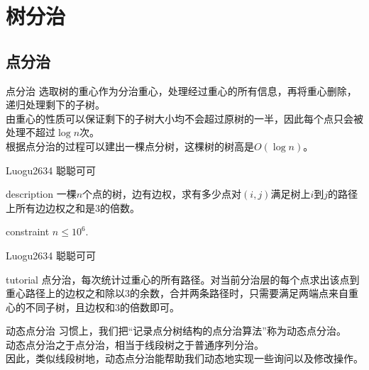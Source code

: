 \documentclass{beamer}
\begin{document}
\section{树分治}
\subsection{点分治}
\begin{frame}{点分治}
	选取树的重心作为分治重心，处理经过重心的所有信息，再将重心删除，递归处理剩下的子树。\\
	
	由重心的性质可以保证剩下的子树大小均不会超过原树的一半，因此每个点只会被处理不超过$\log n$次。\\
	
	根据点分治的过程可以建出一棵点分树，这棵树的树高是$O(\log n)$。
\end{frame}
\begin{frame}{Luogu2634 聪聪可可}
	\begin{block}{description}
		一棵$n$个点的树，边有边权，求有多少点对$(i, j)$满足树上$i$到$j$的路径上所有边边权之和是$3$的倍数。
	\end{block}
	\begin{block}{constraint}
		$n \le 10^6.$
	\end{block}
\end{frame}
\begin{frame}{Luogu2634 聪聪可可}
	\begin{block}{tutorial}
		点分治，每次统计过重心的所有路径。对当前分治层的每个点求出该点到重心路径上的边权之和除以$3$的余数，合并两条路径时，只需要满足两端点来自重心的不同子树，且边权和$3$的倍数即可。
	\end{block}
\end{frame}
\begin{frame}{动态点分治}
	习惯上，我们把“记录点分树结构的点分治算法”称为动态点分治。\\
	
	动态点分治之于点分治，相当于线段树之于普通序列分治。\\
	
	因此，类似线段树地，动态点分治能帮助我们动态地实现一些询问以及修改操作。
\end{frame}
\end{document}
